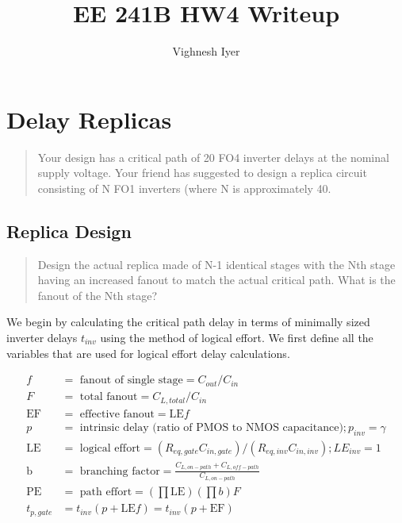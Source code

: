 \documentclass[11pt]{article}
\begin{document}
\title{EE 241B HW4 Writeup}

\author{Vighnesh Iyer}
\date{}
\maketitle

\tableofcontents

\section{Delay Replicas}
\begin{quote}
	Your design has a critical path of 20 FO4 inverter delays at the nominal supply voltage. Your friend has suggested to design a replica circuit consisting of N FO1 inverters (where N is approximately 40.
\end{quote}

\subsection{Replica Design}
\begin{quote}
	Design the actual replica made of N-1 identical stages with the Nth stage having an increased fanout to match the actual critical path. What is the fanout of the Nth stage?
\end{quote}

We begin by calculating the critical path delay in terms of minimally sized inverter delays $t_{inv}$ using the method of logical effort. We first define all the variables that are used for logical effort delay calculations.

\begin{align}
	f &= \text{ fanout of single stage} = C_{out} / C_{in} \nonumber \\
	F &= \text { total fanout} = C_{L,total} / C_{in} \nonumber \\
	\text{EF} &= \text { effective fanout} = \text{LE} f \nonumber \\
	p &= \text{ intrinsic delay (ratio of PMOS to NMOS capacitance)}; p_{inv} = \gamma \nonumber \\
	\text{LE} &= \text { logical effort} = (R_{eq,gate} C_{in,gate}) / (R_{eq,inv} C_{in,inv}); LE_{inv} = 1 \nonumber \\
	\text{b} &= \text{ branching factor} = \frac{C_{L,on-path} + C_{L,off-path}}{C_{L,on-path}} \nonumber \\
	\text{PE} &= \text{ path effort} = (\prod \text{LE}) (\prod b) F \nonumber \\
	t_{p,gate} &= t_{inv}(p + \text{LE}f) = t_{inv}(p + \text{EF}) \nonumber
\end{align}
\end{document}
